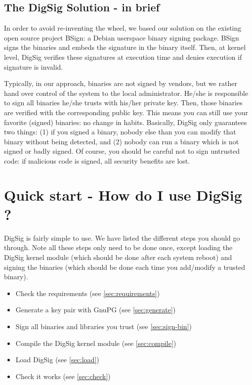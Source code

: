 \documentclass{article}
\begin{document}
\subsection{The DigSig Solution - in brief}

In order to avoid re-inventing the wheel, we based our solution on the
existing open source project BSign: a Debian userspace binary
signing package. BSign signs the binaries and embeds the signature in
the binary itself. Then, at kernel level, DigSig verifies these 
signatures at execution time and denies execution if signature is invalid. 

Typically, in our approach, binaries are not signed by vendors, but we
rather hand over control of the system to the local administrator.
He/she is responsible to sign all binaries he/she trusts with his/her
private key. Then, those binaries are verified with the corresponding
public key. This means you can still use your favorite (signed)
binaries: no change in habits. Basically, DigSig only guarantees two
things: (1) if you signed a binary, nobody else than you can modify
that binary without being detected, and (2) nobody can run a binary
which is not signed or badly signed.  Of course, you should be careful
not to sign untrusted code: if malicious code is signed, all security
benefits are lost.

\section{Quick start - How do I use DigSig ?}

DigSig is fairly simple to use. We have listed the different steps you should go through. Note all these steps only need to be done once, except loading the DigSig kernel module (which should be done after each system reboot) and signing the binaries (which should be done each time you add/modify a trusted binary).

\begin{itemize}
\item Check the requirements (see \ref{sec:requirements})
\item Generate a key pair with GnuPG \cite{GnuPG} (see \ref{sec:generate})
\item Sign all binaries and libraries you trust (see \ref{sec:sign-bin})
\item Compile the DigSig kernel module (see \ref{sec:compile})
\item Load DigSig (see \ref{sec:load})
\item Check it works (see \ref{sec:check})
\end{itemize}
\end{document}
